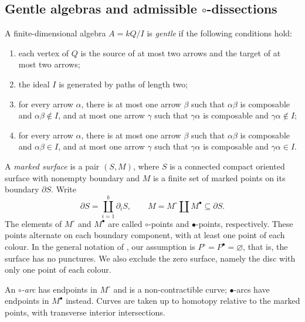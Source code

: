 \documentclass[11pt]{amsart}
\theoremstyle{definition}
\theoremstyle{plain}
\theoremstyle{definition}
\theoremstyle{definition}
\begin{document}
\noindent\begin{minipage}{\linewidth}
\subsection{Gentle algebras and admissible \texorpdfstring{$\circ$}{o}-dissections}

A finite-dimensional algebra $A=kQ/I$ is \emph{gentle} if the following
conditions hold:
\begin{enumerate}[label=\textup{(\roman*)},leftmargin=2.6em]
\item each vertex of $Q$ is the source of at most two arrows and the target
      of at most two arrows;
\item the ideal $I$ is generated by paths of length two;
\item for every arrow $\alpha$, there is at most one arrow $\beta$ such
      that $\alpha\beta$ is composable and $\alpha\beta\notin I$, and at
      most one arrow $\gamma$ such that $\gamma\alpha$ is composable and
      $\gamma\alpha\notin I$;
\item for every arrow $\alpha$, there is at most one arrow $\beta$ such
      that $\alpha\beta$ is composable and $\alpha\beta\in I$, and at
      most one arrow $\gamma$ such that $\gamma\alpha$ is composable and
      $\gamma\alpha\in I$.
\end{enumerate}
\end{minipage}\par

A \emph{marked surface} is a pair $(S,M)$, where $S$ is a connected compact
oriented surface with nonempty boundary and $M$ is a finite set of marked
points on its boundary $\partial S$.  Write
\[
 \partial S=\coprod_{i=1}^{b}\partial_iS,
 \qquad M=M^{\circ}\amalg M^{\bullet}\subseteq\partial S.
\]
The elements of $M^{\circ}$ and $M^{\bullet}$ are called $\circ$-points and
$\bullet$-points, respectively.  These points alternate on each boundary
component, with at least one point of each colour.  In the general notation
of \cite{ChangJinSchroll}, our assumption is
$P^{\circ}=P^{\bullet}=\varnothing$, that is, the surface has no punctures.
We also exclude the zero surface, namely the disc with only one point of
each colour.

An \emph{$\circ$-arc} has endpoints in $M^{\circ}$ and is a non-contractible
curve; $\bullet$-arcs have endpoints in $M^{\bullet}$ instead.  Curves are
taken up to homotopy relative to the marked points, with transverse
interior intersections.
\end{document}
